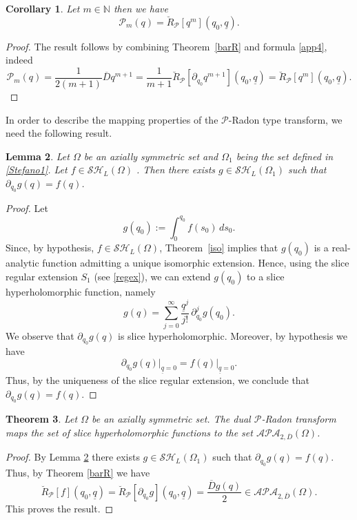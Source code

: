 \documentclass[reqno,11pt]{amsart}
\numberwithin{equation}{section}
\newtheorem{theorem}{Theorem}[section]
\newtheorem{lemma}[theorem]{Lemma}
\newtheorem{corollary}[theorem]{Corollary}
\theoremstyle{definition}
\begin{document}
\begin{corollary}
Let $m \in \mathbb{N}$ then we have
$$ \mathcal{P}_m(q)= \breve{R}_{\mathcal{P}}[q^m](q_0, \underline{q}).$$
\end{corollary}
\begin{proof}
The result follows by combining Theorem~\ref{barR} and formula \eqref{app4}, indeed
$$ \mathcal{P}_m(q)= \frac{1}{2(m+1)} \overline{D}q^{m+1}=\frac{1}{m+1}\breve{R}_{\mathcal{P}}[\partial_{q_0} q^{m+1}](q_0, \underline{q})= \breve{R}_{\mathcal{P}}[q^m](q_0, \underline{q}).$$
\end{proof}


In order to describe the mapping properties of the $\mathcal{P}$-Radon type transform, we need the following result.

\begin{lemma}
	\label{inver}
	Let $\Omega$ be an axially symmetric set and $\Omega_1$ being the set defined in \eqref{Stefano1}. Let $f \in \mathcal{SH}_L(\Omega)$ . Then there exists $g \in \mathcal{SH}_L(\Omega_1)$ such that $ \partial_{q_0}g(q)=f(q)$.
\end{lemma}
\begin{proof}
Let
$$
g(q_0):= \int_0^{q_0} f(s_0)\, ds_0.
$$
Since, by hypothesis, $f \in \mathcal{SH}_L(\Omega)$, Theorem~\ref{iso} implies that $g(q_0)$ is a real-analytic function admitting a unique isomorphic extension. Hence, using the slice regular extension $S_1$ (see \eqref{regex}), we can extend $g(q_0)$ to a slice hyperholomorphic function, namely
$$
g(q)= \sum_{j=0}^{\infty} \frac{\underline{q}^j}{j!}\, \partial_{q_0}^j g(q_0).
$$
We observe that $\partial_{q_0} g(q)$ is slice hyperholomorphic. Moreover, by hypothesis we have
$$
\partial_{q_0} g(q)\big|_{\underline{q}=0}= f(q)\big|_{\underline{q}=0}.
$$
Thus, by the uniqueness of the slice regular extension, we conclude that $ \partial_{q_0} g(q)=f(q)$.
\end{proof}


\begin{theorem}
Let $\Omega$ be an axially symmetric set. The dual $\mathcal{P}$-Radon transform maps the set of slice hyperholomorphic functions to the set $ \mathcal{APA}_{2, \overline{D}}(\Omega)$.
\end{theorem}
\begin{proof}
By Lemma \ref{inver} there exists $g \in \mathcal{SH}_L(\Omega_1)$ such that $ \partial_{q_0}g(q)=f(q)$. Thus, by Theorem \ref{barR}  we have
$$ \breve{R}_{\mathcal{P}}[f](q_0, \underline{q})=\breve{R}_{\mathcal{P}}[\partial_{q_0}g](q_0, \underline{q})=\frac{\overline{D}g(q)}{2} \in\mathcal{APA}_{2, \overline{D}}(\Omega).$$
This proves the result.
\end{proof}
\end{document}
